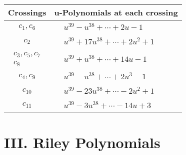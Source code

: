 \documentclass[1p]{elsarticle_modified}
\theoremstyle{definition}
\begin{document}
\begin{tabular}{m{50pt}|m{274pt}}
Crossings & \hspace{64pt}u-Polynomials at each crossing \\
\hline $$\begin{aligned}c_{1},c_{6}\end{aligned}$$&$\begin{aligned}
&u^{39}- u^{38}+\cdots+2 u-1
\end{aligned}$\\
\hline $$\begin{aligned}c_{2}\end{aligned}$$&$\begin{aligned}
&u^{39}+17 u^{38}+\cdots+2 u^2+1
\end{aligned}$\\
\hline $$\begin{aligned}c_{3},c_{5},c_{7}\\c_{8}\end{aligned}$$&$\begin{aligned}
&u^{39}+u^{38}+\cdots+14 u-1
\end{aligned}$\\
\hline $$\begin{aligned}c_{4},c_{9}\end{aligned}$$&$\begin{aligned}
&u^{39}- u^{38}+\cdots+2 u^3-1
\end{aligned}$\\
\hline $$\begin{aligned}c_{10}\end{aligned}$$&$\begin{aligned}
&u^{39}-23 u^{38}+\cdots-2 u^2+1
\end{aligned}$\\
\hline $$\begin{aligned}c_{11}\end{aligned}$$&$\begin{aligned}
&u^{39}-3 u^{38}+\cdots-14 u+3
\end{aligned}$\\
\hline
\end{tabular}\newpage\renewcommand{\arraystretch}{1}
\centering \section*{ III. Riley Polynomials}
\end{document}
